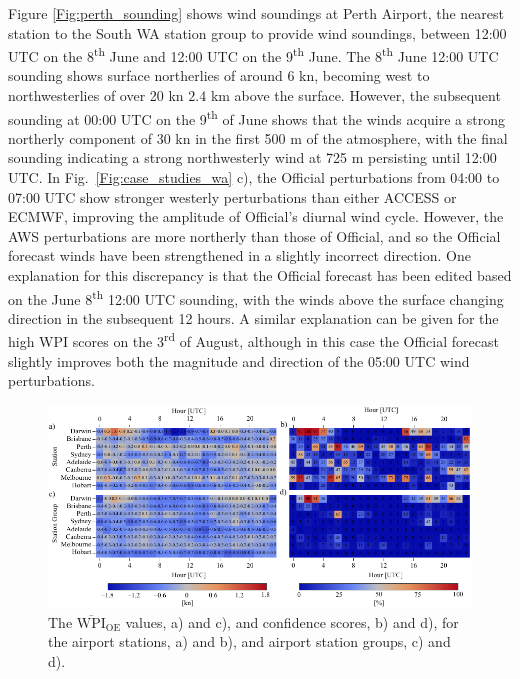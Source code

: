 \documentclass{ametsoc}
\begin{document}
Figure \ref{Fig:perth_sounding} shows wind soundings at Perth Airport, the nearest station to the South WA station group to provide wind soundings, between 12:00 UTC on the 8\textsuperscript{th} June and 12:00 UTC on the 9\textsuperscript{th} June. The 8\textsuperscript{th} June 12:00 UTC sounding shows surface northerlies of around $6$ kn, becoming west to northwesterlies of over 20 kn $2.4$ km above the surface. However, the subsequent sounding at 00:00 UTC on the 9\textsuperscript{th} of June shows that the winds acquire a strong northerly component of 30 kn in the first 500 m of the atmosphere, with the final sounding indicating a strong northwesterly wind at 725 m persisting until 12:00 UTC. In Fig.~\ref{Fig:case_studies_wa} c), the Official perturbations from 04:00 to 07:00 UTC show stronger westerly perturbations than either ACCESS or ECMWF, improving the amplitude of Official's diurnal wind cycle. However, the AWS perturbations are more northerly than those of Official, and so the Official forecast winds have been strengthened in a slightly incorrect direction. One explanation for this discrepancy is that the Official forecast has been edited based on the June 8\textsuperscript{th} 12:00 UTC sounding, with the winds above the surface changing direction in the subsequent 12 hours. A similar explanation can be given for the high WPI scores on the  3\textsuperscript{rd} of August, although in this case the Official forecast slightly improves both the magnitude and direction of the 05:00 UTC wind perturbations.

\begin{figure}
\centering
\includegraphics[width=39pc]{airport_wpi.pdf}
\caption{The $\overline{\text{WPI}}_\text{OE}$ values, a) and c), and confidence scores, b) and d), for the airport stations, a) and b), and airport station groups, c) and d).}
\label{Fig:airport_wpi}
\end{figure}
\end{document}
